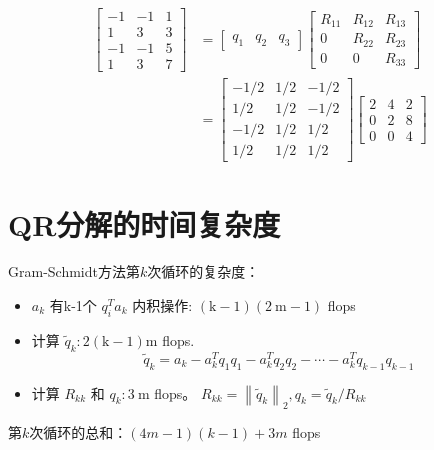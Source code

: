 \begin{example}
$$
\begin{aligned}
\left[\begin{array}{rrr}
-1 & -1 & 1 \\
1 & 3 & 3 \\
-1 & -1 & 5 \\
1 & 3 & 7
\end{array}\right] &=\left[\begin{array}{lll}
q_{1} & q_{2} & q_{3}
\end{array}\right]\left[\begin{array}{ccc}
R_{11} & R_{12} & R_{13} \\
0 & R_{22} & R_{23} \\
0 & 0 & R_{33}
\end{array}\right] \\
&=\left[\begin{array}{rrr}
-1 / 2 & 1 / 2 & -1 / 2 \\
1 / 2 & 1 / 2 & -1 / 2 \\
-1 / 2 & 1 / 2 & 1 / 2 \\
1 / 2 & 1 / 2 & 1 / 2
\end{array}\right]\left[\begin{array}{rrr}
2 & 4 & 2 \\
0 & 2 & 8 \\
0 & 0 & 4
\end{array}\right]
\end{aligned}
$$
\end{example}



\section{QR分解的时间复杂度}

Gram-Schmidt方法第$k$次循环的复杂度：

\begin{itemize}
    \item $ a_{k} $ 有k-1个 $ q_{i}^{T} a_{k} $ 内积操作: $ (\mathrm{k}-1)(2 \mathrm{~m}-1) $ flops
    \item 计算 $ \tilde{q}_{k}: 2(\mathrm{k}-1) \mathrm{m} $ flops. $$ \quad \tilde{q}_{k}=a_{k}-a_{k}^{T} q_{1} q_{1}-a_{k}^{T} q_{2} q_{2}-\cdots-a_{k}^{T} q_{k-1} q_{k-1} $$
    \item 计算 $ R_{k k} $ 和 $ q_{k}: 3 \mathrm{~m} $ flops。 $  R_{k k}=\left\|\tilde{q}_{k}\right\|_{2}, q_{k}=\tilde{q}_{k} / R_{k k} $
\end{itemize}

第$k$次循环的总和：$(4m-1)(k-1)+3m$ flops

